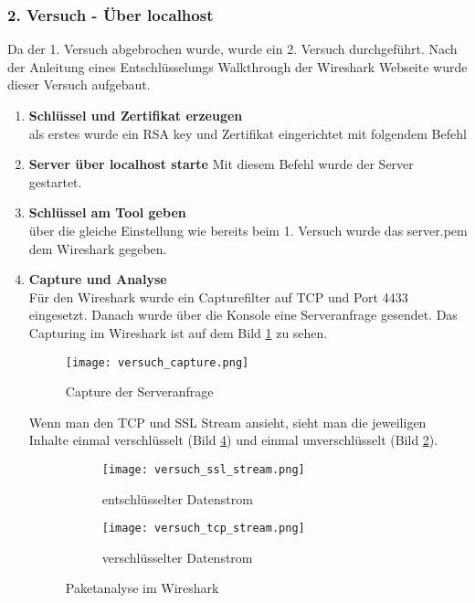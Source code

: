 	\subsubsection{2. Versuch - Über localhost}
	Da der 1. Versuch abgebrochen wurde, wurde ein 2. Versuch durchgeführt. Nach der Anleitung eines Entschlüsselungs Walkthrough der Wireshark Webseite \cite{wireshark} wurde dieser Versuch aufgebaut.
	\begin{enumerate}
		\item \textbf{Schlüssel und Zertifikat erzeugen}\\
		als erstes wurde ein RSA key und Zertifikat eingerichtet mit folgendem Befehl
		\item \textbf{Server über localhost starte}
		 Mit diesem Befehl wurde der Server gestartet.
		\item \textbf{Schlüssel am Tool geben}\\
		über die gleiche Einstellung wie bereits beim 1. Versuch wurde das server.pem dem Wireshark gegeben.
		\item \textbf{Capture und Analyse}\\
		Für den Wireshark wurde ein Capturefilter auf TCP und Port 4433 eingesetzt. Danach wurde über die Konsole eine Serveranfrage gesendet.
		Das Capturing im Wireshark ist auf dem Bild \ref{fig:versuch_capture} zu sehen.
		\begin{figure}[H]
			\centering
			\texttt{[image: versuch\_capture.png]}
			\caption{Capture der Serveranfrage}
			\label{fig:versuch_capture}
		\end{figure}				
		Wenn man den TCP und SSL Stream ansieht, sieht man die jeweiligen Inhalte einmal verschlüsselt (Bild \ref{fig:tcp_stream}) und einmal unverschlüsselt (Bild \ref{fig:ssl_stream}).
		\begin{figure}[H]
			\centering
			\begin{subfigure}{.4\textwidth}
				\centering
				\texttt{[image: versuch\_ssl\_stream.png]}
				\caption{entschlüsselter Datenstrom}
				\label{fig:ssl_stream}
			\end{subfigure}
			\begin{subfigure}{.4\textwidth}
			 	\centering
				\texttt{[image: versuch\_tcp\_stream.png]}
				\caption{verschlüsselter Datenstrom}
				\label{fig:tcp_stream}
			\end{subfigure}
			\caption{Paketanalyse im Wireshark}
		\end{figure}
	\end{enumerate}
	
